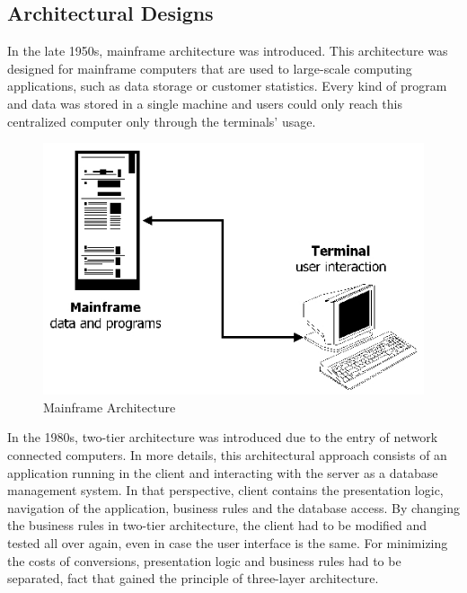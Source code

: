 \newpage
\subsection{Architectural Designs}
In the late 1950s, mainframe architecture was introduced. This architecture was designed for mainframe computers that are used to large-scale computing applications, such as data storage or customer statistics. Every kind of program and data was stored in a single machine and users could only reach this centralized computer only through the terminals' usage.

\begin{figure}[h!]
	\begin{center}
		\includegraphics[scale=0.45]{images/mainframe.jpg}
	\end{center}
	\caption{Mainframe Architecture}
\end{figure}

In the 1980s, two-tier architecture was introduced due to the entry of network connected computers. In more details, this architectural approach consists of an application running in the client and interacting with the server as a database management system. In that perspective, client contains the presentation logic, navigation of the application, business rules and the database access. By changing the business rules in two-tier architecture, the client had to be modified and tested all over again, even in case the user interface is the same. For minimizing the costs of conversions, presentation logic and business rules had to be separated, fact that gained the principle of three-layer architecture.

